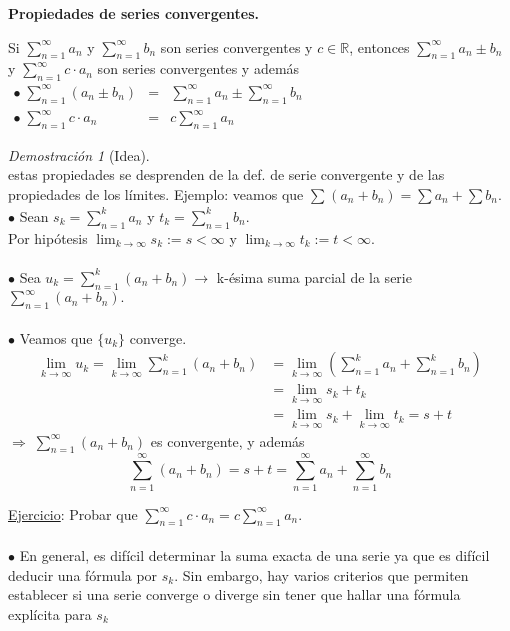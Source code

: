 \documentclass{article}
\theoremstyle{definition}
\theoremstyle{remark}
\newtheorem*{demo}{Demostración}
\begin{document}
\begin{center}
\textbf{Propiedades de series convergentes.}
\end{center}
\begin{teo}
  Si $\sum_{n=1}^{\infty}{a_n}$ y $\sum_{n=1}^{\infty}{b_n}$ son series convergentes y $c \in \mathbb{R}$, entonces $\sum_{n=1}^{\infty}{a_n \pm b_n}$ y $\sum_{n=1}^{\infty}{c\cdot a_n}$ son series convergentes y además \\ $\begin{array}{lcl}
    \bullet \; \sum_{n=1}^{\infty}{(a_n \pm b_n)}&=&\sum_{n=1}^{\infty}{a_n} \pm \sum_{n=1}^{\infty}{b_n}\\
    \bullet \; \sum_{n=1}^{\infty}{c\cdot a_n}&=&c\sum_{n=1}^{\infty}{a_n}
  \end{array}$
\end{teo}
\pagebreak 
\begin{demo}[Idea] \; \\
  estas propiedades se desprenden de la def. de serie convergente y de las propiedades de los límites. Ejemplo: veamos que $\sum_{}^{}{(a_n+b_n)}=\sum a_n + \sum b_n$. \\
  $\bullet$ \; Sean $s_k=\sum_{n=1}^ka_n$ y $t_k=\sum_{n=1}^{k}{b_n}.$ \\
  Por hipótesis $\lim_{k\to\infty}{s_k}:=s<\infty$ y $\lim_{k \to \infty}{t_k}:=t<\infty.$ \\\\
  $\bullet$ \; Sea $u_k=\sum_{n=1}^{k}{(a_n+b_n)}\rightarrow $ k-ésima suma parcial de la serie $\sum_{n=1}^{\infty}{(a_n+b_n)}.$ \\\\
  $\bullet$ \; Veamos que $\{u_k\}$ converge. \\
  \begin{align*}
    \lim_{k \to \infty}{u_k} = \lim_{k\to\infty}{\sum_{n=1}^{k}{(a_n+b_n)}} &= \lim_{k\to\infty}{\left(\sum_{n=1}^{k}{a_n}+\sum_{n=1}^{k}{b_n}\right)} \\
                                                                            &= \lim_{k\to\infty}{s_k+t_k} \\
                                                                            &= \lim_{k\to\infty}{s_k}+\lim_{k \to \infty}{t_k} = s+t
  \end{align*}
$\Rightarrow \; \sum_{n=1}^{\infty}{(a_n+b_n)}$ es convergente, y además $$\sum_{n=1}^{\infty}{(a_n+b_n)} = s+t=\sum_{n=1}^{\infty}{a_n}+\sum_{n=1}^{\infty}{b_n}$$ 
\end{demo}
\underline{Ejercicio}: Probar que $\sum_{n=1}^{\infty}{c\cdot a_n}=c\sum_{n=1}^{\infty}{a_n}$.
\\\\
$\bullet$ \; En general, es difícil determinar la suma exacta de una serie ya que es difícil deducir una fórmula por $s_k$. Sin embargo, hay varios criterios que permiten establecer si una serie converge o diverge sin tener que hallar una fórmula explícita para $s_k$
\end{document}
